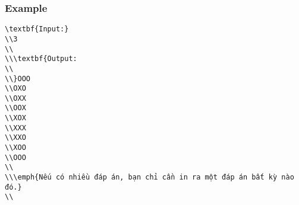 \subsubsection{   Example  }
\begin{verbatim}
\textbf{Input:}
\\3
\\
\\\textbf{Output:
\\
\\}OOO
\\OXO
\\OXX
\\OOX
\\XOX
\\XXX
\\XXO
\\XOO
\\OOO
\\
\\\emph{Nếu có nhiều đáp án, bạn chỉ cần in ra một đáp án bất kỳ nào đó.}
\\\end{verbatim}